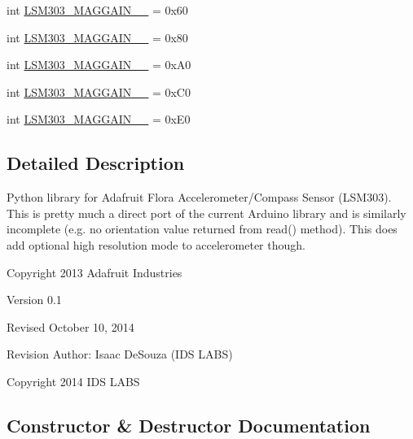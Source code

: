 \begin{DoxyCompactItemize}
\item 
int \hyperlink{classdriver_1_1DRIVER__CORE_1_1Adafruit__LSM303_a690a2ccf1305ddb8e369e42e140a3d9e}{L\+S\+M303\+\_\+\+M\+A\+G\+G\+A\+I\+N\+\_\+\_} = 0x60
\item 
int \hyperlink{classdriver_1_1DRIVER__CORE_1_1Adafruit__LSM303_aabf347d0927ecaea47e318cc804e10a0}{L\+S\+M303\+\_\+\+M\+A\+G\+G\+A\+I\+N\+\_\+\_} = 0x80
\item 
int \hyperlink{classdriver_1_1DRIVER__CORE_1_1Adafruit__LSM303_a1875f919180b6da6408c2d005bb8bdad}{L\+S\+M303\+\_\+\+M\+A\+G\+G\+A\+I\+N\+\_\+\_} = 0x\+A0
\item 
int \hyperlink{classdriver_1_1DRIVER__CORE_1_1Adafruit__LSM303_a9dfa52c66b43d044d18e642243a4c15d}{L\+S\+M303\+\_\+\+M\+A\+G\+G\+A\+I\+N\+\_\+\_} = 0x\+C0
\item 
int \hyperlink{classdriver_1_1DRIVER__CORE_1_1Adafruit__LSM303_a4c33c59d6577266becd976da47b46e7c}{L\+S\+M303\+\_\+\+M\+A\+G\+G\+A\+I\+N\+\_\+\_} = 0x\+E0
\end{DoxyCompactItemize}


\subsection{Detailed Description}
\begin{DoxyVerb}Python library for Adafruit Flora Accelerometer/Compass Sensor (LSM303).
This is pretty much a direct port of the current Arduino library and is
similarly incomplete (e.g. no orientation value returned from read()
method).  This does add optional high resolution mode to accelerometer
though.

Copyright 2013 Adafruit Industries

Version 0.1

Revised October 10, 2014

Revision Author: Isaac DeSouza (IDS LABS)

Copyright 2014 IDS LABS
\end{DoxyVerb}
 

\subsection{Constructor \& Destructor Documentation}
\hypertarget{classdriver_1_1DRIVER__CORE_1_1Adafruit__LSM303_ae5cf180d90f8866edaab4807bbe8f7bc}{}
